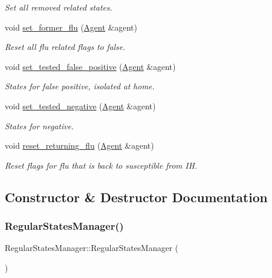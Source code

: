 \begin{DoxyCompactItemize}
\begin{DoxyCompactList}\small\item\em Set all removed related states. \end{DoxyCompactList}\item 
void \hyperlink{classRegularStatesManager_a061efc051ba2c64a02a2ce66d915a610}{set\+\_\+former\+\_\+flu} (\hyperlink{classAgent}{Agent} \&agent)
\begin{DoxyCompactList}\small\item\em Reset all flu related flags to false. \end{DoxyCompactList}\item 
void \hyperlink{classRegularStatesManager_a7bdff7e59ae0d521f32ec1a33d7c2c41}{set\+\_\+tested\+\_\+false\+\_\+positive} (\hyperlink{classAgent}{Agent} \&agent)
\begin{DoxyCompactList}\small\item\em States for false positive, isolated at home. \end{DoxyCompactList}\item 
void \hyperlink{classRegularStatesManager_af336981bd4dfe51eaca43262b89632d3}{set\+\_\+tested\+\_\+negative} (\hyperlink{classAgent}{Agent} \&agent)
\begin{DoxyCompactList}\small\item\em States for negative. \end{DoxyCompactList}\item 
void \hyperlink{classRegularStatesManager_ab225ce7069cd51e2c451ac8fbd28c3e3}{reset\+\_\+returning\+\_\+flu} (\hyperlink{classAgent}{Agent} \&agent)
\begin{DoxyCompactList}\small\item\em Reset flags for flu that is back to susceptible from IH. \end{DoxyCompactList}\end{DoxyCompactItemize}


\subsection{Constructor \& Destructor Documentation}
\mbox{\label{classRegularStatesManager_a05c6533bf5e460afef3e89d75413a510}} 
\subsubsection{\texorpdfstring{Regular\+States\+Manager()}{RegularStatesManager()}}
{\footnotesize\ttfamily Regular\+States\+Manager\+::\+Regular\+States\+Manager (\begin{DoxyParamCaption}{ }\end{DoxyParamCaption})\hspace{0.3cm}{\ttfamily [default]}}



